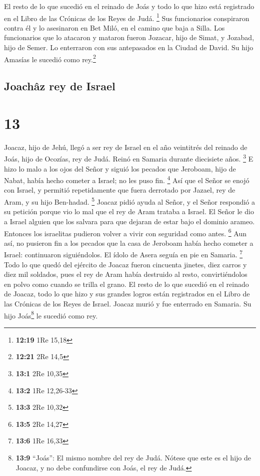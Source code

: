  El resto de lo que sucedió en el reinado de Joás y todo
lo que hizo está registrado en el Libro de las Crónicas de los Reyes de
Judá. \footnote{\textbf{12:19} 1Re 15,18}  Sus
funcionarios conspiraron contra él y lo asesinaron en Bet Miló, en el
camino que baja a Silla.  Los funcionarios que lo
atacaron y mataron fueron Jozacar, hijo de Simat, y Jozabad, hijo de
Semer. Lo enterraron con sus antepasados en la Ciudad de David. Su hijo
Amasías le sucedió como rey.\footnote{\textbf{12:21} 2Re 14,5}

\hypertarget{joachuxe2z-rey-de-israel}{%
\subsection{Joachâz rey de Israel}\label{joachuxe2z-rey-de-israel}}

\hypertarget{section-12}{%
\section{13}\label{section-12}}

 Joacaz, hijo de Jehú, llegó a ser rey de Israel en el año
veintitrés del reinado de Joás, hijo de Ocozías, rey de Judá. Reinó en
Samaria durante diecisiete años. \footnote{\textbf{13:1} 2Re 10,35}
 E hizo lo malo a los ojos del Señor y siguió los pecados
que Jeroboam, hijo de Nabat, había hecho cometer a Israel; no les puso
fin. \footnote{\textbf{13:2} 1Re 12,26-33}  Así que el
Señor se enojó con Israel, y permitió repetidamente que fuera derrotado
por Jazael, rey de Aram, y su hijo Ben-hadad. \footnote{\textbf{13:3}
  2Re 10,32}  Joacaz pidió ayuda al Señor, y el Señor
respondió a su petición porque vio lo mal que el rey de Aram trataba a
Israel.  El Señor le dio a Israel alguien que los salvara
para que dejaran de estar bajo el dominio arameo. Entonces los
israelitas pudieron volver a vivir con seguridad como antes. \footnote{\textbf{13:5}
  2Re 14,27}  Aun así, no pusieron fin a los pecados que
la casa de Jeroboam había hecho cometer a Israel: continuaron
siguiéndolos. El ídolo de Asera seguía en pie en Samaria. \footnote{\textbf{13:6}
  1Re 16,33}  Todo lo que quedó del ejército de Joacaz
fueron cincuenta jinetes, diez carros y diez mil soldados, pues el rey
de Aram había destruido al resto, convirtiéndolos en polvo como cuando
se trilla el grano.  El resto de lo que sucedió en el
reinado de Joacaz, todo lo que hizo y sus grandes logros están
registrados en el Libro de las Crónicas de los Reyes de Israel.
 Joacaz murió y fue enterrado en Samaria. Su hijo
Joás\footnote{\textbf{13:9} ``Joás'': El mismo nombre del rey de Judá.
  Nótese que este es el hijo de Joacaz, y no debe confundirse con Joás,
  el rey de Judá.} le sucedió como rey.

